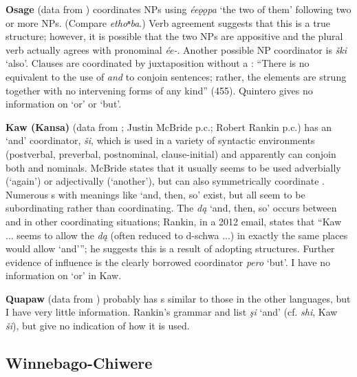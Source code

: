 \documentclass[output=paper]{LSP/langsci}
\begin{document}
\textbf{Osage} (data from \citealt{Quintero2004}) coordinates NPs using \textit{ée\k{o}\k{o}pa} `the two of them' following two or more NPs. (Compare  \textit{ethoⁿba}.) Verb agreement suggests that this is a true  structure; however, it is possible that the two NPs are appositive and the plural verb actually agrees with pronominal \textit{ée-}. Another possible NP coordinator is \textit{\v{s}ki} `also'. Clauses are coordinated by juxtaposition without a : ``There is no  equivalent to the  use of \textit{and} to conjoin sentences; rather, the elements are strung together with no intervening forms of any kind'' (455). Quintero gives no information on `or' or `but'.

\textbf{Kaw (Kansa)} (data from   \citealt{CumberlandRankin2012}; Justin McBride p.c.; Robert Rankin p.c.) has an `and' coordinator, \textit{\v{s}i}, which is used in a variety of syntactic environments (postverbal, preverbal, postnominal, clause-initial) and apparently can conjoin both  and nominals. McBride states that it usually seems to be used adverbially (`again') or adjectivally (`another'), but can also symmetrically coordinate . Numerous s with meanings like `and, then, so' exist, but all seem to be subordinating rather than coordinating. The  \textit{d\k{a}} `and, then, so' occurs between  and in other coordinating situations; Rankin, in a 2012 email, states that ``Kaw ... seems to allow the  \textit{d\k{a}} (often reduced to d-schwa ...) in exactly the same places  would allow `and'''; he suggests this is a result of adopting   structures. Further evidence of  influence is the clearly borrowed coordinator \textit{pero} `but'. I have no information on `or' in Kaw.

\textbf{Quapaw} (data from \citealt{Rankin2002,Rankin2005b}) probably has s similar to those in the other  languages, but I have very little information. Rankin's grammar and  list \textit{\c{s}i} `and' (cf.  \textit{shi}, Kaw \textit{\v{s}i}), but give no indication of how it is used.

\subsection{Winnebago-Chiwere}
 
\end{document}
